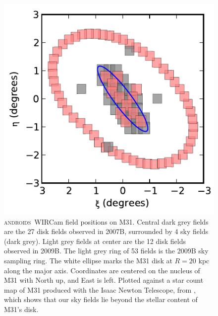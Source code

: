 \documentclass[iop]{emulateapj}
\newcommand{\androids}{\textsc{androids}}
\begin{document}
\begin{figure}[t]
\centering
\includegraphics[width=\columnwidth]{figs/fieldmap}
\caption{\androids\ WIRCam field positions on M31.
Central dark grey fields are the 27 disk fields observed in 2007B, surrounded by 4 sky fields (dark grey).
Light grey fields at center are the 12 disk fields observed in 2009B.
The light grey ring of 53 fields is the 2009B sky sampling ring.
The white ellipse marks the M31 disk at $R=20$ kpc along the major axis.
Coordinates are centered on the nucleus of M31 with North up, and East is left.
Plotted against a star count map of M31 produced with the Isaac Newton Telescope, from \cite{Ibata:2005}, which shows that our sky fields lie beyond the stellar content of M31's disk.}
\label{fig:fieldmap}
\end{figure}

\end{document}
